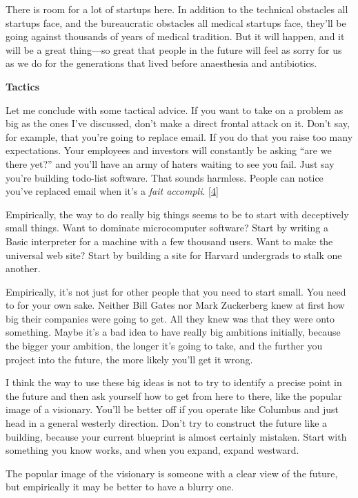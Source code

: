 There is room for a lot of startups here. In addition to the technical
obstacles all startups face, and the bureaucratic obstacles all medical
startups face, they'll be going against thousands of years of medical
tradition. But it will happen, and it will be a great thing---so great
that people in the future will feel as sorry for us as we do for the
generations that lived before anaesthesia and antibiotics.

\textbf{Tactics}

Let me conclude with some tactical advice. If you want to take on a
problem as big as the ones I've discussed, don't make a direct frontal
attack on it. Don't say, for example, that you're going to replace
email. If you do that you raise too many expectations. Your employees
and investors will constantly be asking ``are we there yet?'' and you'll
have an army of haters waiting to see you fail. Just say you're building
todo-list software. That sounds harmless. People can notice you've
replaced email when it's a \emph{fait accompli}. {[}\hyperref[f4n]{4}{]}

Empirically, the way to do really big things seems to be to start with
deceptively small things. Want to dominate microcomputer software? Start
by writing a Basic interpreter for a machine with a few thousand users.
Want to make the universal web site? Start by building a site for
Harvard undergrads to stalk one another.

Empirically, it's not just for other people that you need to start
small. You need to for your own sake. Neither Bill Gates nor Mark
Zuckerberg knew at first how big their companies were going to get. All
they knew was that they were onto something. Maybe it's a bad idea to
have really big ambitions initially, because the bigger your ambition,
the longer it's going to take, and the further you project into the
future, the more likely you'll get it wrong.

I think the way to use these big ideas is not to try to identify a
precise point in the future and then ask yourself how to get from here
to there, like the popular image of a visionary. You'll be better off if
you operate like Columbus and just head in a general westerly direction.
Don't try to construct the future like a building, because your current
blueprint is almost certainly mistaken. Start with something you know
works, and when you expand, expand westward.

The popular image of the visionary is someone with a clear view of the
future, but empirically it may be better to have a blurry one.

